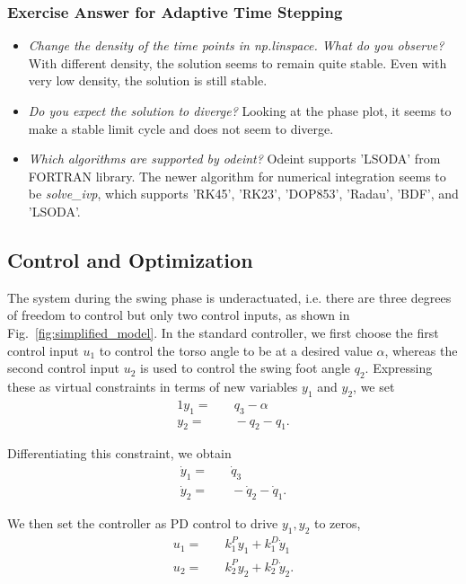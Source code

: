 \subsubsection{Exercise Answer for Adaptive Time Stepping}
\begin{itemize}

\item \emph{Change the density of the time points in np.linspace. What do you observe?}
With different density, the solution seems to remain quite stable. Even with very low density, the solution is still stable. 
\item \emph{Do you expect the solution to diverge?}
Looking at the phase plot, it seems to make a stable limit cycle and does not seem to diverge.
\item \emph{Which algorithms are supported by odeint?}
Odeint supports 'LSODA' from FORTRAN library. The newer algorithm for numerical integration seems to be \emph{solve\_ivp}, which supports 'RK45', 'RK23', 'DOP853', 'Radau', 'BDF', and 'LSODA'. 
\end{itemize}

\subsection{Control and Optimization}
\label{sec:control_opt}

The system during the swing phase is underactuated, i.e. there are three degrees of freedom to control but only two control inputs, as shown in Fig.~\ref{fig:simplified_model}. In the standard controller, we first choose the first control input $u_1$ to control the torso angle to be at a desired value $\alpha$, whereas the second control input $u_2$ is used to control the swing foot angle $q_2$. Expressing these as virtual constraints in terms of new variables $y_1$ and $y_2$, we set
\begin{alignat}{1}
y_1 = & \quad q_3 - \alpha \\
y_2 = & \quad -q_2 - q_1. 
\end{alignat}

Differentiating this constraint, we obtain
\begin{align}
\dot{y}_1 = & \quad \dot{q}_3  \\
\dot{y}_2 = & \quad -\dot{q}_2 - \dot{q}_1. 
\end{align}

We then set the controller as PD control to drive $y_1, y_2$ to zeros,
\begin{align}
u_1 = & \quad k_1^P y_1 + k_1^D \dot{y}_1 \\
u_2 = & \quad k_2^P y_2 + k_2^D \dot{y}_2.
\end{align}


